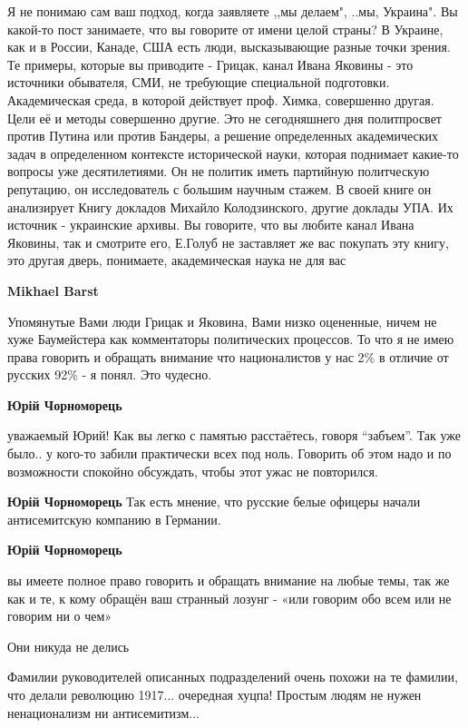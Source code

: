 \begin{itemize}
\begin{itemize}
Я не понимаю сам ваш подход, когда заявляете ,,мы делаем", ..мы, Украина". Вы
какой-то пост занимаете, что вы говорите от имени целой страны? В Украине, как
и в России, Канаде, США есть люди, высказывающие разные точки зрения. Те
примеры, которые вы приводите - Грицак, канал Ивана Яковины - это источники
обывателя, СМИ, не требующие специальной подготовки. Академическая среда, в
которой действует проф. Химка, совершенно другая. Цели её и методы совершенно
другие. Это не сегодняшнего дня политпросвет против Путина или против Бандеры,
а решение определенных академических задач в определенном контексте
исторической науки, которая поднимает какие-то вопросы уже десятилетиями. Он не
политик иметь партийную политческую репутацию, он исследователь с большим
научным стажем. В своей книге он анализирует Книгу докладов Михайло
Колодзинского, другие доклады УПА. Их источник - украинские архивы. Вы
говорите, что вы любите канал Ивана Яковины, так и смотрите его, Е.Голуб не
заставляет же вас покупать эту книгу, это другая дверь, понимаете,
академическая наука не для вас

\textbf{Mikhael Barst} 

Упомянутые Вами люди Грицак и Яковина, Вами низко оцененные, ничем не хуже
Баумейстера как комментаторы политических процессов. То что я не имею права
говорить и обращать внимание что националистов у нас 2\% в отличие от русских
92\% - я понял. Это чудесно.


\textbf{Юрій Чорноморець} 

уважаемый Юрий! Как вы легко с памятью расстаётесь, говоря \enquote{забъем}. Так уже
было.. у кого-то забили практически всех под ноль. Говорить об этом надо и по
возможности спокойно обсуждать, чтобы этот ужас не повторился.

\textbf{Юрій Чорноморець} Так есть мнение, что русские белые офицеры начали антисемитскую компанию в Германии.

\textbf{Юрій Чорноморець} 

вы имеете полное право говорить и обращать внимание на любые темы, так же как и
те, к кому обращён ваш странный лозунг - «или говорим обо всем или не говорим
ни о чем»

\end{itemize} %

Они никуда не делись


Фамилии руководителей описанных подразделений очень похожи на те фамилии, что
делали революцию 1917... очередная хуцпа! Простым людям не нужен ненационализм
ни антисемитизм...



\end{itemize}
